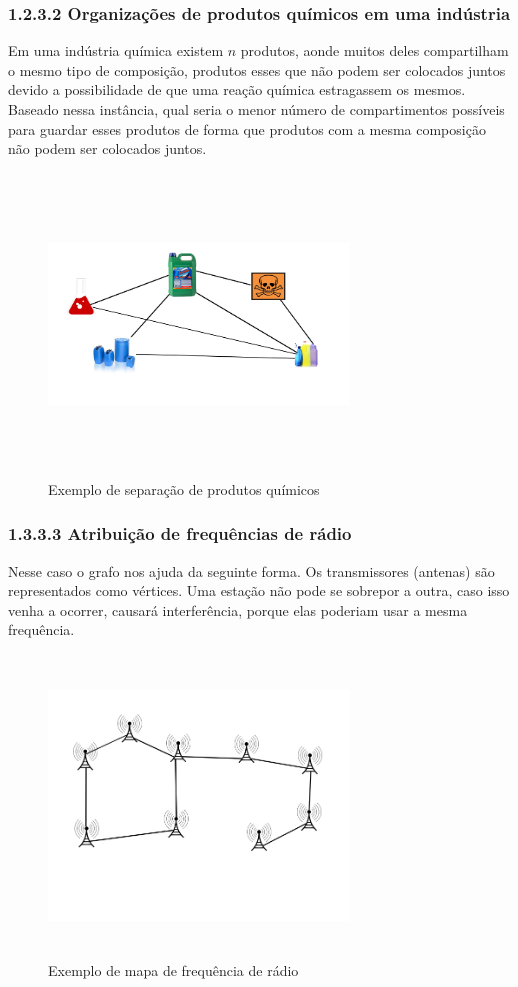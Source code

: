 \documentclass[12pt]{article}
\begin{document}
	
	\subsubsection*{   1.2.3.2 Organizações de produtos químicos em uma indústria}
	
	Em uma indústria química existem $n$ produtos, aonde muitos deles compartilham o mesmo tipo de composição, produtos esses que não podem ser colocados juntos devido a possibilidade de que uma reação química estragassem os mesmos. Baseado nessa instância, qual seria o menor número de compartimentos possíveis para guardar esses produtos de forma que produtos com a mesma composição não podem ser colocados juntos.
	
	\begin{figure}[!htb]
		\centering
		\includegraphics[width=8cm, height=8cm]{exemploProdutosQuimicos}
		\caption{Exemplo de separação de produtos químicos}    
	\end{figure}
	
	\subsubsection*{   1.3.3.3 Atribuição de frequências de rádio}
	
	Nesse caso o grafo nos ajuda da seguinte forma. Os transmissores (antenas) são representados como vértices. Uma estação não pode se sobrepor a outra, caso isso venha a ocorrer, causará interferência, porque elas poderiam usar a mesma frequência.
	
	\begin{figure}[!htb]
		\centering
		\includegraphics[width=8cm, height=8cm]{FrequenciaDeRadio}
		\caption{Exemplo de mapa de frequência de rádio}    
	\end{figure}
	
\end{document}
